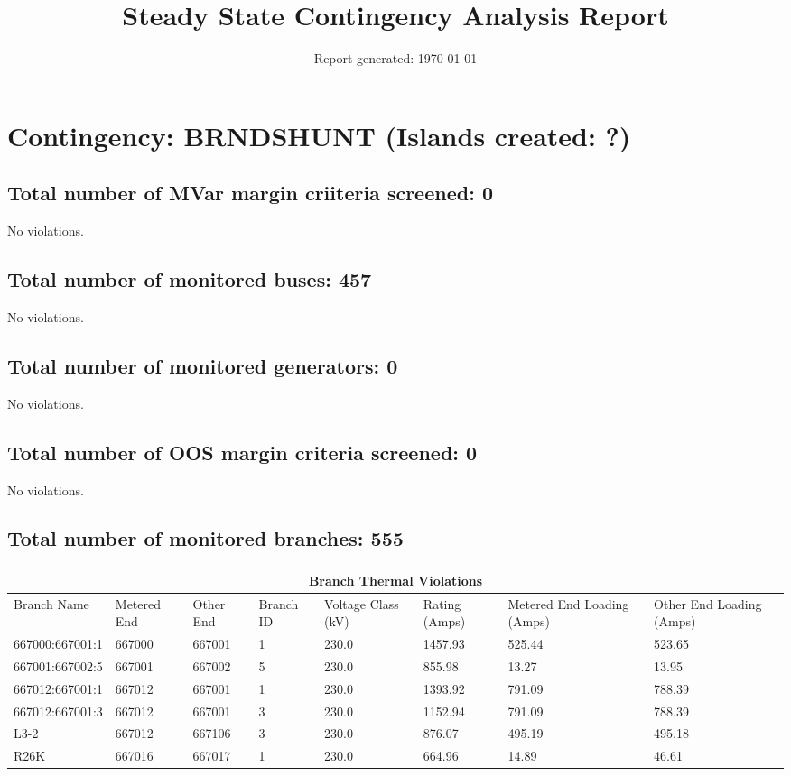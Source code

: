 \documentclass{article}%
\title{Steady State Contingency Analysis Report\vspace{-3ex}}%
\date{Report generated: \today\vspace{-2ex}}%
\begin{document}
%
\normalsize%
\maketitle%
\section*{Contingency: BRNDSHUNT (Islands created: ?)}%
\label{sec:ContingencyBRNDSHUNT(Islandscreated?)}%
\subsection*{Total number of MVar margin criiteria screened: 0}%
\label{subsec:TotalnumberofMVarmargincriiteriascreened0}%
No violations.

%
\subsection*{Total number of monitored buses: 457}%
\label{subsec:Totalnumberofmonitoredbuses457}%
No violations.

%
\subsection*{Total number of monitored generators: 0}%
\label{subsec:Totalnumberofmonitoredgenerators0}%
No violations.

%
\subsection*{Total number of OOS margin criteria screened: 0}%
\label{subsec:TotalnumberofOOSmargincriteriascreened0}%
No violations.

%
\subsection*{Total number of monitored branches: 555}%
\label{subsec:Totalnumberofmonitoredbranches555}%
\begin{tabularx}{\textwidth}{| p{3cm} | X | X | X | X | X | X | X |}%
\hline%
\multicolumn{8}{|c|}{Branch Thermal Violations}\\%
\hline%
Branch Name&Metered End&Other End&Branch ID&Voltage Class (kV)&Rating (Amps)&Metered End Loading (Amps)&Other End Loading (Amps)\\%
\hline%
667000:667001:1&667000&667001&1&230.0&1457.93&525.44&523.65\\%
\hline%
\hline%
667001:667002:5&667001&667002&5&230.0&855.98&13.27&13.95\\%
\hline%
\hline%
667012:667001:1&667012&667001&1&230.0&1393.92&791.09&788.39\\%
\hline%
\hline%
667012:667001:3&667012&667001&3&230.0&1152.94&791.09&788.39\\%
\hline%
\hline%
L3{-}2&667012&667106&3&230.0&876.07&495.19&495.18\\%
\hline%
\hline%
R26K&667016&667017&1&230.0&664.96&14.89&46.61\\%
\hline%
\end{tabularx}
\end{document}
